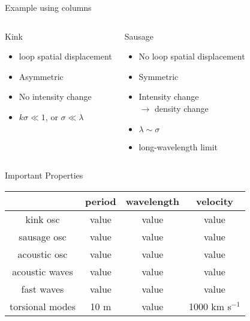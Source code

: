 \documentclass{beamer}
\begin{document}
\begin{frame}{Example using columns}
\begin{columns}
    \begin{block}{Kink}
        \begin{itemize}
            \item loop spatial displacement
            \item Asymmetric
            \item No intensity change
            \item $k\sigma \ll 1$, or $\sigma\ll\lambda$
        \end{itemize}
    \end{block}
    \begin{block}{Sausage}
        \begin{itemize}
            \item No loop spatial displacement
            \item Symmetric
            \item Intensity change\\ $\rightarrow$ density change
            \item $\lambda\sim\sigma$
            \item long-wavelength limit
        \end{itemize}
    \end{block}
\end{columns}
\end{frame}%
\begin{frame}{Important Properties}
    \begin{center}
        \begin{tabular}{c|c|c|c|}
            \cline{2-4} & {\textbf{period}} & {\textbf{wavelength}} &
                {\textbf{velocity}}\\
            \hline \multicolumn{0}{|c|}{kink osc} & value & value & value\\
            \hline \multicolumn{0}{|c|}{sausage osc} & value & value & value\\
            \hline \multicolumn{0}{|c|}{acoustic osc} & value & value & value\\
            \hline \multicolumn{0}{|c|}{acoustic waves} & value & value & value\\
            \hline \multicolumn{0}{|c|}{fast waves} & value & value & value\\
            \hline \multicolumn{0}{|c|}{torsional modes} & 10 m & value &
                1000 km s$^{-1}$\\
            \hline
        \end{tabular}
    \end{center}
\end{frame}%
\end{document}
